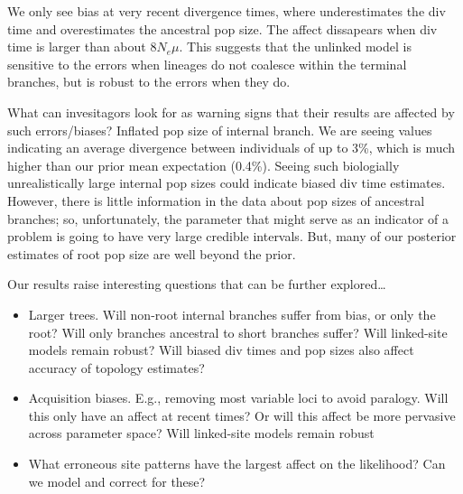 We only see bias at very recent divergence times, where \ecoevolity
underestimates the div time and overestimates the ancestral pop size.
The affect dissapears when div time is larger than about $8N_e\mu$.
This suggests that the unlinked model is sensitive to the errors
when lineages do not coalesce within the terminal branches,
but is robust to the errors when they do.

What can invesitagors look for as warning signs that their results
are affected by such errors/biases?
Inflated pop size of internal branch.
We are seeing values indicating an average divergence between individuals of up
to 3\%, which is much higher than our prior mean expectation (0.4\%).
Seeing such biologially unrealistically large internal pop sizes could indicate
biased div time estimates.
However, there is little information in the data about pop sizes of ancestral
branches; so, unfortunately, the parameter that might serve as an indicator
of a problem is going to have very large credible intervals.
But, many of our posterior estimates of root pop size are well beyond the
prior.

Our results raise interesting questions that can be further explored\ldots
\begin{itemize}
    \item Larger trees. Will non-root internal branches suffer from bias, or
        only the root? Will only branches ancestral to short branches suffer?
        Will linked-site models remain robust?
        Will biased div times and pop sizes also affect accuracy of topology
        estimates?
    \item Acquisition biases. E.g., removing most variable loci to avoid
        paralogy. Will this only have an affect at recent times? Or will
        this affect be more pervasive across parameter space?
        Will linked-site models remain robust
    \item What erroneous site patterns have the largest affect on
        the likelihood? Can we model and correct for these?
\end{itemize}

